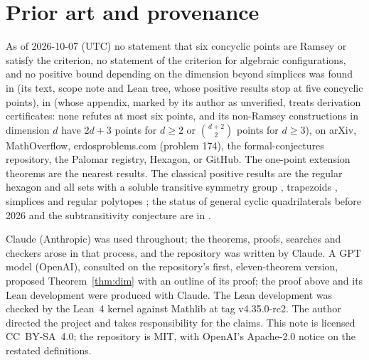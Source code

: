 \documentclass[11pt]{article}
\theoremstyle{definition}
\theoremstyle{remark}
\begin{document}
\section{Prior art and provenance}

As of 2026-10-07 (UTC) no statement that six concyclic points are Ramsey or satisfy the criterion, no
statement of the criterion for algebraic configurations, and no positive bound depending on the
dimension beyond simplices \cite{fr} was found in \cite{oai} (its text, scope note and Lean tree, whose
positive results stop at five concyclic points), in \cite{palvolgyi} (whose appendix, marked by its author as unverified, treats
derivation certificates: none refutes at most six points, and its non-Ramsey constructions in dimension
$d$ have $2d + 3$ points for $d \geq 2$ or $\binom{d+2}{2}$ points for $d \geq 3$), on arXiv, MathOverflow, erdosproblems.com (problem 174),
the formal-conjectures repository, the Palomar registry, Hexagon, or GitHub. The one-point extension
theorems \cite{moore, mirabi} are the nearest results. The classical positive results are the regular
hexagon and all sets with a soluble transitive symmetry group \cite{kriz1}, trapezoids \cite{kriz2},
simplices \cite{fr} and regular polytopes \cite{cantwell}; the status of general cyclic quadrilaterals
before 2026 and the subtransitivity conjecture are in \cite{lrw}.

Claude (Anthropic) was used throughout; the theorems, proofs, searches and checkers arose in that
process, and the repository was written by Claude. A GPT model (OpenAI), consulted on the repository's
first, eleven-theorem version, proposed
Theorem~\ref{thm:dim} with an outline of its proof; the proof above and its Lean development were
produced with Claude. The Lean development was checked by the Lean~4 kernel \cite{lean} against Mathlib
\cite{mathlib} at tag v4.35.0-rc2. The author directed the project and takes responsibility for the
claims. This note is licensed CC~BY-SA~4.0; the repository is MIT, with OpenAI's Apache-2.0 notice on
the restated definitions.
\end{document}
